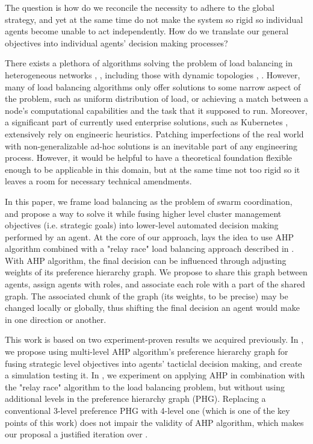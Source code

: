 The question is how do we reconcile the necessity to adhere to the global strategy, and yet at the same time do not make
the system so rigid so individual agents become unable to act independently.
How do we translate our general objectives into individual agents' decision making processes?

There exists a plethora of algorithms solving the problem of load balancing in heterogeneous networks \cite{gamal-2019}, \cite{adhikari-2018}, including those with dynamic topologies \cite{sahoo-2020}, \cite{zhang-2018}.
However, many of load balancing algorithms only offer solutions to some narrow aspect of the problem, such as uniform distribution of load, or achieving a match between a node's computational capabilities and the task that it supposed to run.
Moreover, a significant part of currently used enterprise solutions, such as Kubernetes \cite{kubernet17}, extensively rely on engineeric heuristics.
Patching imperfections of the real world with non-generalizable ad-hoc solutions is an inevitable part of any engineering process.
However, it would be helpful to have a theoretical foundation flexible enough to be applicable in this domain, but at the same time not too rigid so it leaves a room for necessary technical amendments.

In this paper, we frame load balancing as the problem of swarm coordination, and propose a way to solve it while fusing higher level cluster management objectives (i.e. strategic goals) into lower-level automated decision making performed by an agent.
At the core of our approach, lays the idea to use AHP \cite{saaty-2008} algorithm combined with a "relay race" load balancing approach described in \cite{gorodetskii-2012}.
With AHP algorithm, the final decision can be influenced through adjusting weights of its preference hierarchy graph.
We propose to share this graph between agents, assign agents with roles, and associate each role with a part of the shared graph.
The associated chunk of the graph (its weights, to be precise) may be changed locally or globally, thus shifting the final decision an agent would make in one direction or another.

This work is based on two experiment-proven results we acquired previously.
In \cite{murashov-2021}, we propose using multi-level AHP algorithm's preference hierarchy graph for fusing strategic level objectives into agents' tacticlal decision making, and create a simulation testing it.
In \cite{murashov-2022}, we experiment on applying AHP in combination with the "relay race" algorithm to the load balancing problem, but without using additional levels in the preference hierarchy graph (PHG).
Replacing a conventional 3-level preference PHG with 4-level one (which is one of the key points of this work) does not impair the validity of AHP algorithm, which makes our proposal a justified iteration over \cite{murashov-2022}.

